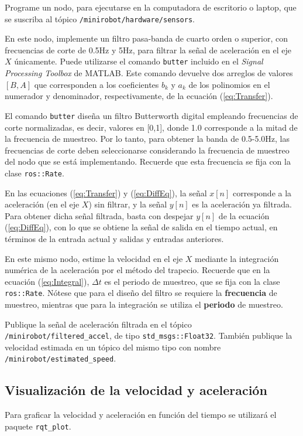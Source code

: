 \documentclass[a4paper,12pt]{article}
\begin{document}
Programe un nodo, para ejecutarse en la computadora de escritorio o laptop, que se suscriba al tópico \texttt{/minirobot/hardware/sensors}. 

En este nodo, implemente un filtro pasa-banda de cuarto orden o superior, con frecuencias de corte de 0.5Hz y 5Hz, para filtrar la señal de aceleración en el eje $X$ únicamente. Puede utilizarse el comando \texttt{butter} incluido en el \textit{Signal Processing Toolbox} de MATLAB. Este comando devuelve dos arreglos de valores $[B,A]$ que corresponden a los coeficientes $b_k$ y $a_k$ de los polinomios en el numerador y denominador, respectivamente, de la ecuación (\ref{eq:Transfer}). 

El comando \texttt{butter} diseña un filtro Butterworth digital empleando frecuencias de corte normalizadas, es decir, valores en [0,1], donde 1.0 corresponde a la mitad de la frecuencia de muestreo. Por lo tanto, para obtener la banda de 0.5-5.0Hz, las frecuencias de corte deben seleccionarse considerando la frecuencia de muestreo del nodo que se está implementando. Recuerde que esta frecuencia se fija con la clase \texttt{ros::Rate}.

En las ecuaciones (\ref{eq:Transfer}) y (\ref{eq:DiffEq}), la señal $x[n]$ corresponde a la aceleración (en el eje $X$) sin filtrar, y la señal $y[n]$ es la aceleración ya filtrada. Para obtener dicha señal filtrada, basta con despejar $y[n]$ de la ecuación (\ref{eq:DiffEq}), con lo que se obtiene la señal de salida en el tiempo actual, en términos de la entrada actual y salidas y entradas anteriores. 

En este mismo nodo, estime la velocidad en el eje $X$ mediante la integración numérica de la aceleración por el método del trapecio. Recuerde que en la ecuación (\ref{eq:Integral}), $\Delta t$ es el periodo de muestreo, que se fija con la clase \texttt{ros::Rate}. Nótese que para el diseño del filtro se requiere la \textbf{frecuencia} de muestreo, mientras que para la integración se utiliza el \textbf{periodo} de muestreo. 

Publique la señal de aceleración filtrada en el tópico \texttt{/minirobot/filtered\_accel}, de tipo \texttt{std\_msgs::Float32}. También publique la velocidad estimada en un tópico del mismo tipo con nombre \texttt{/minirobot/estimated\_speed}.

\subsection{Visualización de la velocidad y aceleración}
Para graficar la velocidad y aceleración en función del tiempo se utilizará el paquete \texttt{rqt\_plot}.
\end{document}
